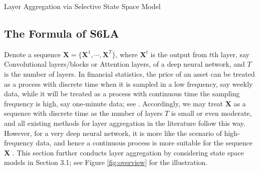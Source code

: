 Layer Aggregation via Selective State Space Model
\subsection{The Formula of S6LA}

Denote a sequence $\mathbf{X} = \{\boldsymbol{X}^1, \cdots , \boldsymbol{X}^T\}$, where $\boldsymbol{X}^t$ is the output from $t$th layer, say Convolutional layers/blocks or Attention layers, of a deep neural network, and $T$ is the number of layers.
In financial statistics, the price of an asset can be treated as a process with discrete time when it is sampled in a low frequency, say weekly data, while it will be treated as a process with continuous time the sampling frequency is high, say one-minute data; see \cite{yuan2023haritomodelshighdimensionalhar}.
Accordingly, we may treat $\mathbf{X}$ as a sequence with discrete time as the number of layers $T$ is small or even moderate, and all existing methods for layer aggregation in the literature follow this way.
However, for a very deep neural network, it is more like the scenario of high-frequency data, and hence a continuous process is more suitable for the sequence $\mathbf{X}$ \citep{sander2022residualneuralnetworksdiscretize,queiruga2020continuous}.
This section further conducts layer aggregation by considering state space models in Section 3.1; see Figure \ref{fig:overview} for the illustration.

